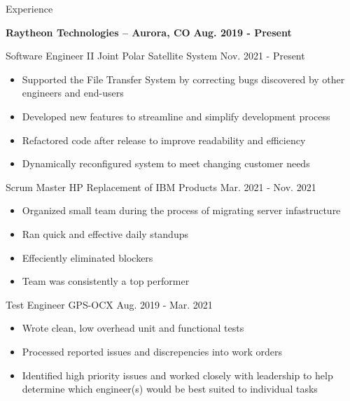 \documentclass[12pt]{resumeclass}
\begin{document}
\vspace{12pt}
\resumesect
    {Experience}
    {\textbf{\large{Raytheon Technologies -- Aurora, CO}} \hfill \textbf{Aug. 2019 - Present}


    \vspace{3pt}
    \experiencesect
	{Software Engineer II}
	{Joint Polar Satellite System}
	{Nov. 2021 - Present}
	{\begin{itemize}[noitemsep,nolistsep]
	    \item Supported the File Transfer System by correcting bugs discovered by other engineers and end-users
	    \item Developed new features to streamline and simplify development process
	    \item Refactored code after release to improve readability and efficiency
	    \item Dynamically reconfigured system to meet changing customer needs
	\end{itemize}}


    \vspace{3pt}
    \experiencesect
	{Scrum Master}
	{HP Replacement of IBM Products}
	{Mar. 2021 - Nov. 2021}
	{\begin{itemize}[noitemsep,nolistsep]
	    \item Organized small team during the process of migrating server infastructure
	    \item Ran quick and effective daily standups
	    \item Effeciently eliminated blockers
	    \item Team was consistently a top performer
	\end{itemize}}


    \vspace{3pt}
    \experiencesect
	{Test Engineer}
	{GPS-OCX}
	{Aug. 2019 - Mar. 2021}
	{\begin{itemize}[noitemsep,nolistsep]
	    \item Wrote clean, low overhead unit and functional tests
	    \item Processed reported issues and discrepencies into work orders
	    \item Identified high priority issues and worked closely with leadership to help determine which engineer(s) would be best suited to individual tasks
	\end{itemize}}}
\end{document}

